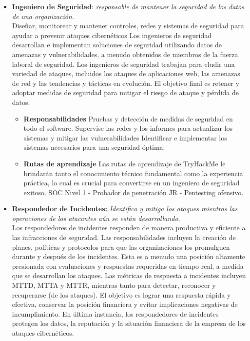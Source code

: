 \begin{itemize}
\item \textbf{Ingeniero de Seguridad}: \textit{responsable de mantener la seguridad de los datos de una organización.}\\
%
Diseñar, monitorear y mantener controles, redes y sistemas de seguridad para ayudar a prevenir ataques cibernéticos
%
Los ingenieros de seguridad desarrollan e implementan soluciones de seguridad utilizando datos de amenazas y vulnerabilidades, a menudo obtenidos de miembros de la fuerza laboral de seguridad. Los ingenieros de seguridad trabajan para eludir una variedad de ataques, incluidos los ataques de aplicaciones web, las amenazas de red y las tendencias y tácticas en evolución. El objetivo final es retener y adoptar medidas de seguridad para mitigar el riesgo de ataque y pérdida de datos.\\
%
\begin{itemize}
\item \textbf{Responsabilidades}
Pruebas y detección de medidas de seguridad en todo el software.
Supervise las redes y los informes para actualizar los sistemas y mitigar las vulnerabilidades
Identificar e implementar los sistemas necesarios para una seguridad óptima.\\ 
\item \textbf{Rutas de aprendizaje}
Las rutas de aprendizaje de TryHackMe le brindarán tanto el conocimiento técnico fundamental como la experiencia práctica, lo cual es crucial para convertirse en un ingeniero de seguridad exitoso.
%
SOC Nivel 1 - 
Probador de penetración JR - 
Pentesting ofensivo. 

\end{itemize}
\item \textbf{Respondedor de Incidentes: }\textit{Identifica y mitiga los ataques mientras las operaciones de los atacantes aún se están desarrollando.}\\
Los respondedores de incidentes responden de manera productiva y eficiente a las infracciones de seguridad. Las responsabilidades incluyen la creación de planes, políticas y protocolos para que las organizaciones los promulguen durante y después de los incidentes. Esta es a menudo una posición altamente presionada con evaluaciones y respuestas requeridas en tiempo real, a medida que se desarrollan los ataques. Las métricas de respuesta a incidentes incluyen MTTD, MTTA y MTTR, mientras tanto para detectar, reconocer y recuperarse (de los ataques). El objetivo es lograr una respuesta rápida y efectiva, conservar la posición financiera y evitar implicaciones negativas de incumplimiento. En última instancia, los respondedores de incidentes protegen los datos, la reputación y la situación financiera de la empresa de los ataques cibernéticos.\\
%


\end{itemize}
